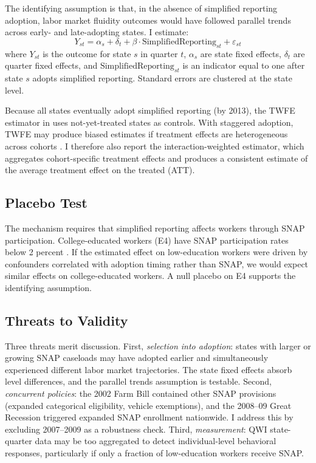 \documentclass[12pt]{article}
\begin{document}
The identifying assumption is that, in the absence of simplified reporting adoption, labor market fluidity outcomes would have followed parallel trends across early- and late-adopting states. I estimate:
\begin{equation}
Y_{st} = \alpha_s + \delta_t + \beta \cdot \text{SimplifiedReporting}_{st} + \varepsilon_{st}
\label{eq:twfe}
\end{equation}
where $Y_{st}$ is the outcome for state $s$ in quarter $t$, $\alpha_s$ are state fixed effects, $\delta_t$ are quarter fixed effects, and $\text{SimplifiedReporting}_{st}$ is an indicator equal to one after state $s$ adopts simplified reporting. Standard errors are clustered at the state level.

Because all states eventually adopt simplified reporting (by 2013), the TWFE estimator in  uses not-yet-treated states as controls. With staggered adoption, TWFE may produce biased estimates if treatment effects are heterogeneous across cohorts \citep{goodman2021difference, dechaisemartin2020two}. I therefore also report the \citet{sun2021estimating} interaction-weighted estimator, which aggregates cohort-specific treatment effects and produces a consistent estimate of the average treatment effect on the treated (ATT).

\subsection{Placebo Test}

The mechanism requires that simplified reporting affects workers through SNAP participation. College-educated workers (E4) have SNAP participation rates below 2 percent \citep{gray2019snap}. If the estimated effect on low-education workers were driven by confounders correlated with adoption timing rather than SNAP, we would expect similar effects on college-educated workers. A null placebo on E4 supports the identifying assumption.

\subsection{Threats to Validity}

Three threats merit discussion. First, \emph{selection into adoption}: states with larger or growing SNAP caseloads may have adopted earlier and simultaneously experienced different labor market trajectories. The state fixed effects absorb level differences, and the parallel trends assumption is testable. Second, \emph{concurrent policies}: the 2002 Farm Bill contained other SNAP provisions (expanded categorical eligibility, vehicle exemptions), and the 2008--09 Great Recession triggered expanded SNAP enrollment nationwide. I address this by excluding 2007--2009 as a robustness check. Third, \emph{measurement}: QWI state-quarter data may be too aggregated to detect individual-level behavioral responses, particularly if only a fraction of low-education workers receive SNAP.
\end{document}
